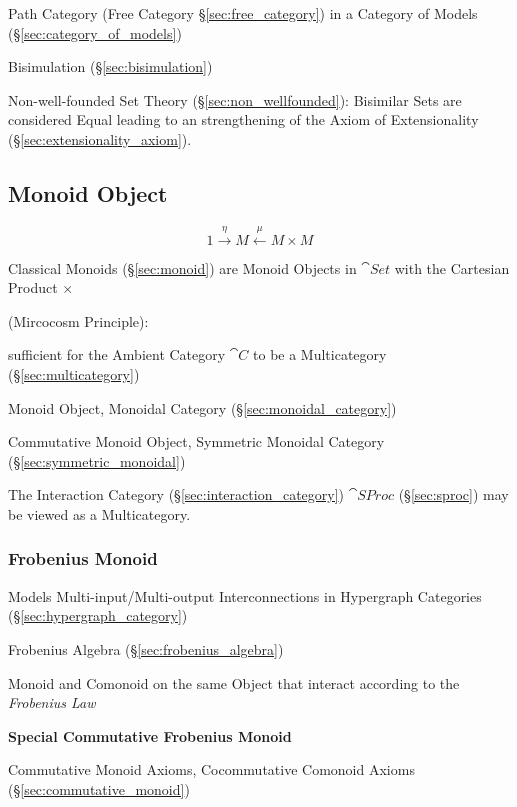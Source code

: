 Path Category (Free Category \S\ref{sec:free_category}) in a Category
of Models (\S\ref{sec:category_of_models})

Bisimulation (\S\ref{sec:bisimulation})

Non-well-founded Set Theory (\S\ref{sec:non_wellfounded}): Bisimilar
Sets are considered Equal leading to an strengthening of the Axiom of
Extensionality (\S\ref{sec:extensionality_axiom}).



\subsection{Monoid Object}\label{sec:monoid_object}

\[
  1 \xrightarrow{\eta} M \xleftarrow{\mu} M \times M
\]

Classical Monoids (\S\ref{sec:monoid}) are Monoid Objects in
$\cat{Set}$ with the Cartesian Product $\times$

(Mircocosm Principle): %

sufficient for the Ambient Category $\cat{C}$ to be a Multicategory
(\S\ref{sec:multicategory})

Monoid Object, Monoidal Category (\S\ref{sec:monoidal_category})

Commutative Monoid Object, Symmetric Monoidal Category
(\S\ref{sec:symmetric_monoidal})

The Interaction Category (\S\ref{sec:interaction_category})
$\cat{SProc}$ (\S\ref{sec:sproc}) may be viewed as a Multicategory.



\subsubsection{Frobenius Monoid}\label{sec:frobenius_monoid}

Models Multi-input/Multi-output Interconnections in Hypergraph
Categories (\S\ref{sec:hypergraph_category})

\fist Frobenius Algebra (\S\ref{sec:frobenius_algebra})

Monoid and Comonoid on the same Object that interact according to the
\emph{Frobenius Law}


\textbf{Special Commutative Frobenius Monoid}

Commutative Monoid Axioms, Cocommutative Comonoid Axioms
(\S\ref{sec:commutative_monoid})

